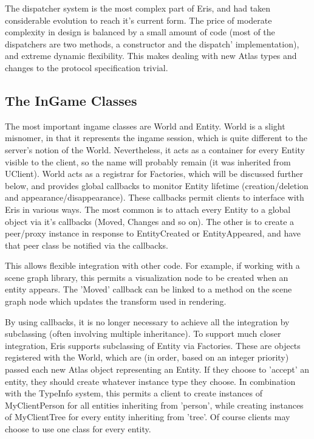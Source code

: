 The dispatcher system is the most complex part of Eris, and had taken considerable
evolution to reach it's current form. The price of moderate complexity in design is balanced
by a small amount of code (most of the dispatchers are two methods, a constructor and the
dispatch' implementation), and extreme dynamic flexibility. This makes dealing with
new Atlas types and changes to the protocol specification trivial.



\subsection{The InGame Classes}



The most important ingame classes are World and Entity. World is a slight misnomer,
in that it represents the ingame session, which is quite different to the server's
notion of the World. Nevertheless, it acts as a container for every Entity visible to
the client, so the name will probably remain (it was inherited from UClient). World
acts as a registrar for Factories, which will be discussed further below, and provides
global callbacks to monitor Entity lifetime (creation/deletion and appearance/disappearance).
These callbacks permit clients to interface with Eris in various ways. The most common
is to attach every Entity to a global object via it's callbacks (Moved, Changes and so on).
The other is to create a peer/proxy instance in response to EntityCreated or EntityAppeared,
and have that peer class be notified via the callbacks.



This allows flexible integration with other code. For example, if working with a scene
graph library, this permits a visualization node to be created when an entity appears.
The 'Moved' callback can be linked to a method on the scene graph node which updates
the transform used in rendering.



By using callbacks, it is no longer necessary to achieve all the integration by
subclassing (often involving multiple inheritance). To support much closer integration,
Eris supports subclassing of Entity via Factories. These are objects registered with
the World, which are (in order, based on an integer priority) passed each new Atlas
object representing an Entity. If they choose to 'accept' an entity, they should create
whatever instance type they choose. In combination with the TypeInfo system, this
permits a client to create instances of MyClientPerson for all entities inheriting from
'person', while creating instances of MyClientTree for every entity inheriting from 'tree'.
Of course clients may choose to use one class for every entity.




